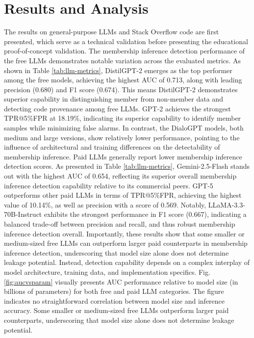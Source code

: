 \documentclass[runningheads]{llncs}
\begin{document}
\section{Results and Analysis}

The results on general-purpose LLMs and Stack Overflow code are first presented, which serve as a technical validation before presenting the educational proof-of-concept validation. The membership inference detection performance of the free LLMs demonstrates notable variation across the evaluated metrics. As shown in Table \ref{tab:llm-metrics}, DistilGPT-2 emerges as the top performer among the free models, achieving the highest AUC of 0.713, along with leading precision (0.680) and F1 score (0.674). This means DistilGPT-2 demonstrates superior capability in distinguishing member from non-member data and detecting code provenance among free LLMs. GPT-2 achieves the strongest TPR@5\%FPR at 18.19\%, indicating its superior capability to identify member samples while minimizing false alarms. In contrast, the DialoGPT models, both medium and large versions, show relatively lower performance, pointing to the influence of architectural and training differences on the detectability of membership inference.
Paid LLMs generally report lower membership inference detection scores. As presented in Table \ref{tab:llm-metrics}, Gemini-2.5-Flash stands out with the highest AUC of 0.654, reflecting its superior overall membership inference detection capability relative to its commercial peers. GPT-5 outperforms other paid LLMs in terms of TPR@5\%FPR, achieving the highest value of 10.14\%, as well as precision with a score of 0.569. Notably, LLaMA-3.3-70B-Instruct exhibits the strongest performance in F1 score (0.667), indicating a balanced trade-off between precision and recall, and thus robust membership inference detection overall. Importantly, these results show that some smaller or medium-sized free LLMs can outperform larger paid counterparts in membership inference detection, underscoring that model size alone does not determine leakage potential. Instead, detection capability depends on a complex interplay of model architecture, training data, and implementation specifics. Fig. \ref{fig:aucvsparam} visually presents AUC performance relative to model size (in billions of parameters) for both free and paid LLM categories. The figure indicates no straightforward correlation between model size and inference accuracy. Some smaller or medium-sized free LLMs outperform larger paid counterparts, underscoring that model size alone does not determine leakage potential. 
\end{document}
